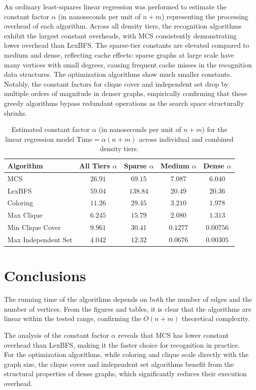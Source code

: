 An ordinary least-squares linear regression was performed to estimate the constant factor $\alpha$ (in nanoseconds per unit of $n+m$) representing the processing overhead of each algorithm. Across all density tiers, the recognition algorithms exhibit the largest constant overheads, with MCS consistently demonstrating lower overhead than LexBFS. The sparse-tier constants are elevated compared to medium and dense, reflecting cache effects: sparse graphs at large scale have many vertices with small degrees, causing frequent cache misses in the recognition data structures. The optimization algorithms show much smaller constants. Notably, the constant factors for clique cover and independent set drop by multiple orders of magnitude in denser graphs, empirically confirming that these greedy algorithms bypass redundant operations as the search space structurally shrinks.


\begin{table}[h!]
\centering
\small
\begin{tabular}{|l|c|c|c|c|}
\hline
\textbf{Algorithm} & \textbf{All Tiers $\alpha$} & \textbf{Sparse $\alpha$} & \textbf{Medium $\alpha$} & \textbf{Dense $\alpha$} \\
\hline
MCS & $26.91$ & $69.15$ & $7.087$ & $6.040$ \\
LexBFS & $59.04$ & $138.84$ & $20.49$ & $20.36$ \\
Coloring & $11.26$ & $29.45$ & $3.210$ & $1.978$ \\
Max Clique & $6.245$ & $15.79$ & $2.080$ & $1.313$ \\
Min Clique Cover & $9.961$ & $30.41$ & $0.1277$ & $0.00756$ \\
Max Independent Set & $4.042$ & $12.32$ & $0.0676$ & $0.00305$ \\
\hline
\end{tabular}
\caption{Estimated constant factor $\alpha$ (in nanoseconds per unit of $n+m$) for the linear regression model $\text{Time} = \alpha(n+m)$ across individual and combined density tiers.}
\label{tab:ols_complexity_analysis}
\end{table}



\section{Conclusions}

The running time of the algorithms depends on both the number of edges and the number of vertices. From the figures and tables, it is clear that the algorithms are linear within the tested range, confirming the $O(n+m)$ theoretical complexity. 

The analysis of the constant factor $\alpha$ reveals that MCS has lower constant overhead than LexBFS, making it the faster choice for recognition in practice. For the optimization algorithms, while coloring and clique scale directly with the graph size, the clique cover and independent set algorithms benefit from the structural properties of dense graphs, which significantly reduces their execution overhead.


